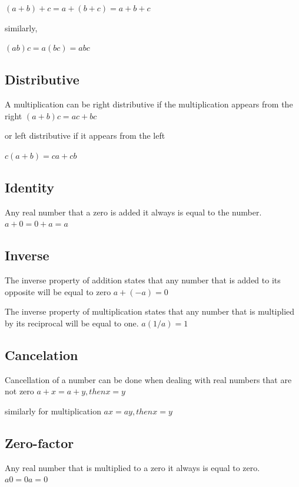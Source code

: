 \documentclass[
]{book}
\begin{document}
\((a+b) + c = a + (b+c) = a + b + c\)

similarly,

\((ab)c = a(bc) = abc\)

\hypertarget{distributive}{%
\subsection{Distributive}\label{distributive}}

A multiplication can be right distributive if the multiplication appears from the right
\((a+b)c = ac+bc\)

or left distributive if it appears from the left

\(c(a+b) = ca + cb\)

\hypertarget{identity}{%
\subsection{Identity}\label{identity}}

Any real number that a zero is added it always is equal to the number.
\(a+0 = 0+a = a\)

\hypertarget{inverse}{%
\subsection{Inverse}\label{inverse}}

The inverse property of addition states that any number that is added to its opposite will be equal to zero
\(a + (-a) = 0\)

The inverse property of multiplication states that any number that is multiplied by its reciprocal will be equal to one.
\(a(1/a) = 1\)

\hypertarget{cancelation}{%
\subsection{Cancelation}\label{cancelation}}

Cancellation of a number can be done when dealing with real numbers that are not zero
\(a+x=a+y, then x=y\)

similarly for multiplication
\(ax=ay, then x=y\)

\hypertarget{zero-factor}{%
\subsection{Zero-factor}\label{zero-factor}}

Any real number that is multiplied to a zero it always is equal to zero.
\(a0 = 0a = 0\)
\end{document}
